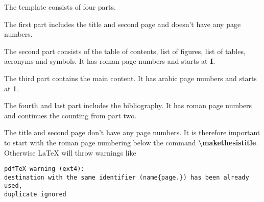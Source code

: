 The template consists of four parts. 

The first part includes the title and second page and doesn't have any page numbers. 

The second part consists of the table of contents, list of figures, list of tables, acronyms and symbols. It has roman page numbers and starts at \textbf{I}. 

The third part contains the main content. It has arabic page numbers and starts at \textbf{1}. 

The fourth and last part includes the bibliography. It has roman page numbers and continues the counting from part two.

The title and second page don't have any page numbers. It is therefore important to start with the roman page numbering below the command \textbf{\textbackslash makethesistitle}. Otherwise \LaTeX{} will throw warnings like

\begin{verbatim}
pdfTeX warning (ext4): 
destination with the same identifier (name{page.}) has been already used,
duplicate ignored
\end{verbatim}